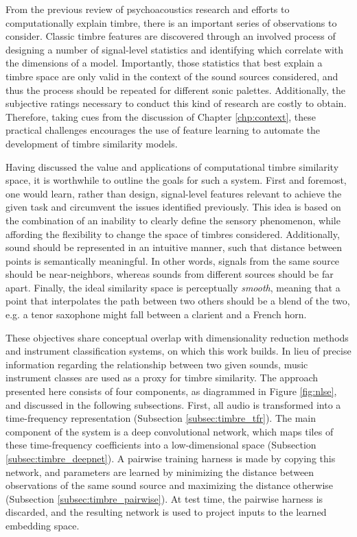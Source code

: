From the previous review of psychoacoustics research and efforts to computationally explain timbre, there is an important series of observations to consider.
Classic timbre features are discovered through an involved process of designing a number of signal-level statistics and identifying which correlate with the dimensions of a model.
Importantly, those statistics that best explain a timbre space are only valid in the context of the sound sources considered, and thus the process should be repeated for different sonic palettes.
Additionally, the subjective ratings necessary to conduct this kind of research are costly to obtain.
Therefore, taking cues from the discussion of Chapter \ref{chp:context}, these practical challenges encourages the use of feature learning to automate the development of timbre similarity models.

Having discussed the value and applications of computational timbre similarity space, it is worthwhile to outline the goals for such a system.
First and foremost, one would learn, rather than design, signal-level features relevant to achieve the given task and circumvent the issues identified previously.
This idea is based on the combination of an inability to clearly define the sensory phenomenon, while affording the flexibility to change the space of timbres considered.
Additionally, sound should be represented in an intuitive manner, such that distance between points is semantically meaningful.
In other words, signals from the same source should be near-neighbors, whereas sounds from different sources should be far apart.
Finally, the ideal similarity space is perceptually \emph{smooth}, meaning that a point that interpolates the path between two others should be a blend of the two, e.g. a tenor saxophone might fall between a clarient and a French horn.

These objectives share conceptual overlap with dimensionality reduction methods and instrument classification systems, on which this work builds.
In lieu of precise information regarding the relationship between two given sounds, music instrument classes are used as a proxy for timbre similarity.
The approach presented here consists of four components, as diagrammed in Figure \ref{fig:nlse}, and discussed in the following subsections.
First, all audio is transformed into a time-frequency representation (Subsection \ref{subsec:timbre_tfr}).
The main component of the system is a deep convolutional network, which maps tiles of these time-frequency coefficients into a low-dimensional space (Subsection \ref{subsec:timbre_deepnet}).
A pairwise training harness is made by copying this network, and parameters are learned by minimizing the distance between observations of the same sound source and maximizing the distance otherwise (Subsection \ref{subsec:timbre_pairwise}).
At test time, the pairwise harness is discarded, and the resulting network is used to project inputs to the learned embedding space.


